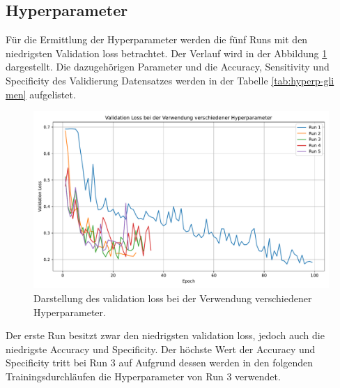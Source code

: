 \subsection{Hyperparameter}
Für die Ermittlung der Hyperparameter werden die fünf Runs mit den niedrigsten Validation loss betrachtet.
Der Verlauf wird in der Abbildung \ref{fig:val_loss gli-men} dargestellt.
Die dazugehörigen Parameter und die Accuracy, Sensitivity und Specificity des Validierung Datensatzes werden in der Tabelle \ref{tab:hyperp-gli men} aufgelistet.
\begin{figure}[H]
  \centering
  \includegraphics[scale=0.4]{plots/Val_loss_Gli_Men.pdf}
  \caption{Darstellung des validation loss bei der Verwendung verschiedener Hyperparameter.}
  \label{fig:val_loss gli-men}
\end{figure}
\begin{table}[H]
    \centering
  \caption{Die fünf Runs mit dem niedrigsten validation loss sowie deren verwendete Hyperparameter und aufgezeichnete Metriken.}
  \label{tab:hyperp-gli men}
\end{table}
Der erste Run besitzt zwar den niedrigsten validation loss, jedoch auch die niedrigste Accuracy und Specificity.
Der höchste Wert der Accuracy und Specificity tritt bei Run 3 auf
Aufgrund dessen werden in den folgenden Trainingsdurchläufen die Hyperparameter von Run 3 verwendet.
